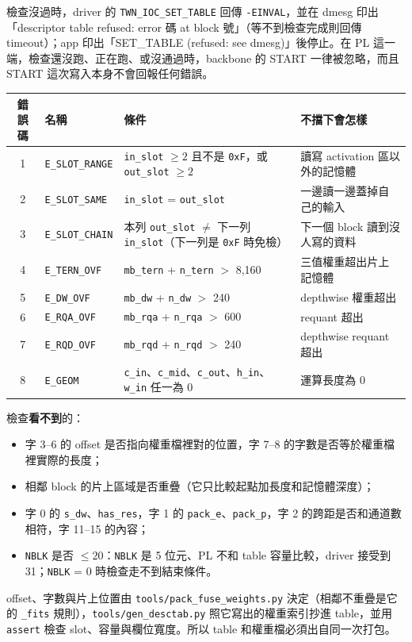 \documentclass[10pt,a4paper]{article}
\newcommand{\f}[1]{\texttt{#1}}
\begin{document}
檢查沒過時，driver 的 \f{TWN\_IOC\_SET\_TABLE} 回傳 \f{-EINVAL}，並在 dmesg 印出「descriptor table refused: error 碼 at block 號」（等不到檢查完成則回傳 timeout）；app 印出「SET\_TABLE (refused: see dmesg)」後停止。在 PL 這一端，檢查還沒跑、正在跑、或沒通過時，backbone 的 START 一律被忽略，而且 START 這次寫入本身不會回報任何錯誤。

\begin{tabular}{@{}c L{30mm} L{60mm} L{50mm}@{}}
\toprule
錯誤碼 & 名稱 & 條件 & 不擋下會怎樣 \\
 & \f{E\_SLOT\_RANGE} & \f{in\_slot} $\ge 2$ 且不是 \f{0xF}，或 \f{out\_slot} $\ge 2$ & 讀寫 activation 區以外的記憶體 \\
2 & \f{E\_SLOT\_SAME}  & \f{in\_slot} = \f{out\_slot} & 一邊讀一邊蓋掉自己的輸入 \\
3 & \f{E\_SLOT\_CHAIN} & 本列 \f{out\_slot} $\ne$ 下一列 \f{in\_slot}（下一列是 \f{0xF} 時免檢） & 下一個 block 讀到沒人寫的資料 \\
4 & \f{E\_TERN\_OVF}   & \f{mb\_tern} + \f{n\_tern} $>$ 8,160 & 三值權重超出片上記憶體 \\
5 & \f{E\_DW\_OVF}     & \f{mb\_dw} + \f{n\_dw} $>$ 240 & depthwise 權重超出 \\
6 & \f{E\_RQA\_OVF}    & \f{mb\_rqa} + \f{n\_rqa} $>$ 600 & requant 超出 \\
7 & \f{E\_RQD\_OVF}    & \f{mb\_rqd} + \f{n\_rqd} $>$ 240 & depthwise requant 超出 \\
8 & \f{E\_GEOM}        & \f{c\_in}、\f{c\_mid}、\f{c\_out}、\f{h\_in}、\f{w\_in} 任一為 0 & 運算長度為 0 \\
\bottomrule
\end{tabular}

\medskip
檢查\textbf{看不到}的：
\begin{itemize}
\item 字 3--6 的 offset 是否指向權重檔裡對的位置，字 7--8 的字數是否等於權重檔裡實際的長度；
\item 相鄰 block 的片上區域是否重疊（它只比較起點加長度和記憶體深度）；
\item 字 0 的 \f{s\_dw}、\f{has\_res}，字 1 的 \f{pack\_e}、\f{pack\_p}，字 2 的跨距是否和通道數相符，字 11--15 的內容；
\item \f{NBLK} 是否 $\le 20$：\f{NBLK} 是 5 位元、PL 不和 table 容量比較，driver 接受到 31；\f{NBLK} = 0 時檢查走不到結束條件。
\end{itemize}
offset、字數與片上位置由 \f{tools/pack\_fuse\_weights.py} 決定（相鄰不重疊是它的 \f{\_fits} 規則），\f{tools/gen\_desctab.py} 照它寫出的權重索引抄進 table，並用 \f{assert} 檢查 slot、容量與欄位寬度。所以 table 和權重檔必須出自同一次打包。
\end{document}
